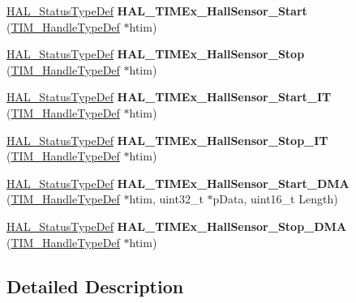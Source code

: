 \begin{DoxyCompactItemize}
\item 
\mbox{\label{group___t_i_m_ex___exported___functions___group1_ga9f4bfa2a4b890a2219ca927bbbb455fc}} 
\hyperlink{stm32f0xx__hal__def_8h_a63c0679d1cb8b8c684fbb0632743478f}{H\+A\+L\+\_\+\+Status\+Type\+Def} {\bfseries H\+A\+L\+\_\+\+T\+I\+M\+Ex\+\_\+\+Hall\+Sensor\+\_\+\+Start} (\hyperlink{struct_t_i_m___handle_type_def}{T\+I\+M\+\_\+\+Handle\+Type\+Def} $\ast$htim)
\item 
\mbox{\label{group___t_i_m_ex___exported___functions___group1_ga714c2a7a51f4ab61b04df84ab182eb86}} 
\hyperlink{stm32f0xx__hal__def_8h_a63c0679d1cb8b8c684fbb0632743478f}{H\+A\+L\+\_\+\+Status\+Type\+Def} {\bfseries H\+A\+L\+\_\+\+T\+I\+M\+Ex\+\_\+\+Hall\+Sensor\+\_\+\+Stop} (\hyperlink{struct_t_i_m___handle_type_def}{T\+I\+M\+\_\+\+Handle\+Type\+Def} $\ast$htim)
\item 
\mbox{\label{group___t_i_m_ex___exported___functions___group1_gaf3e7068c5bc6fc74e016cc8e990cbb02}} 
\hyperlink{stm32f0xx__hal__def_8h_a63c0679d1cb8b8c684fbb0632743478f}{H\+A\+L\+\_\+\+Status\+Type\+Def} {\bfseries H\+A\+L\+\_\+\+T\+I\+M\+Ex\+\_\+\+Hall\+Sensor\+\_\+\+Start\+\_\+\+IT} (\hyperlink{struct_t_i_m___handle_type_def}{T\+I\+M\+\_\+\+Handle\+Type\+Def} $\ast$htim)
\item 
\mbox{\label{group___t_i_m_ex___exported___functions___group1_gac6ab7ab0cada425a8d4deb637bd2ad71}} 
\hyperlink{stm32f0xx__hal__def_8h_a63c0679d1cb8b8c684fbb0632743478f}{H\+A\+L\+\_\+\+Status\+Type\+Def} {\bfseries H\+A\+L\+\_\+\+T\+I\+M\+Ex\+\_\+\+Hall\+Sensor\+\_\+\+Stop\+\_\+\+IT} (\hyperlink{struct_t_i_m___handle_type_def}{T\+I\+M\+\_\+\+Handle\+Type\+Def} $\ast$htim)
\item 
\mbox{\label{group___t_i_m_ex___exported___functions___group1_ga3d0d063498f6888d61411d56380f5211}} 
\hyperlink{stm32f0xx__hal__def_8h_a63c0679d1cb8b8c684fbb0632743478f}{H\+A\+L\+\_\+\+Status\+Type\+Def} {\bfseries H\+A\+L\+\_\+\+T\+I\+M\+Ex\+\_\+\+Hall\+Sensor\+\_\+\+Start\+\_\+\+D\+MA} (\hyperlink{struct_t_i_m___handle_type_def}{T\+I\+M\+\_\+\+Handle\+Type\+Def} $\ast$htim, uint32\+\_\+t $\ast$p\+Data, uint16\+\_\+t Length)
\item 
\mbox{\label{group___t_i_m_ex___exported___functions___group1_gab361d1aa6e0eb244886b93908beded6f}} 
\hyperlink{stm32f0xx__hal__def_8h_a63c0679d1cb8b8c684fbb0632743478f}{H\+A\+L\+\_\+\+Status\+Type\+Def} {\bfseries H\+A\+L\+\_\+\+T\+I\+M\+Ex\+\_\+\+Hall\+Sensor\+\_\+\+Stop\+\_\+\+D\+MA} (\hyperlink{struct_t_i_m___handle_type_def}{T\+I\+M\+\_\+\+Handle\+Type\+Def} $\ast$htim)
\end{DoxyCompactItemize}


\subsection{Detailed Description}
